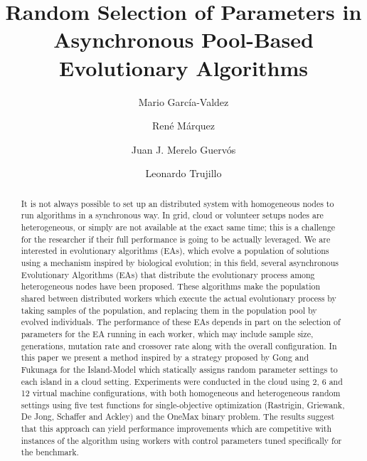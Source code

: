 \documentclass{llncs}
\begin{document}
\sloppy

\title{Random Selection of Parameters in Asynchronous Pool-Based Evolutionary Algorithms}

\author{Mario Garc\'ia-Valdez \and Ren\'e M\'arquez \and Juan J. Merelo Guerv\'os \and  Leonardo Trujillo }


\maketitle

\begin{abstract}
It is not always possible to set up an distributed system with
homogeneous nodes to run algorithms in a synchronous way. In grid,
cloud or volunteer setups nodes are heterogeneous, or simply are not
available at the exact same time; this is a challenge for the researcher if
their full performance is going to be actually leveraged. We are
interested in evolutionary algorithms (EAs), which evolve a population
of solutions using a mechanism inspired by biological evolution; in this field, 
several asynchronous Evolutionary Algorithms (EAs) that distribute the
evolutionary process among heterogeneous nodes have
been proposed. These algorithms make the population shared between
distributed workers  which execute the actual evolutionary
process by taking samples of the population, and replacing them in the
population pool by evolved individuals. The performance of these EAs
depends in part on the selection of parameters for the EA running in
each worker, which may include sample size, generations, mutation rate
and crossover rate along with the overall configuration. In this paper
we present a method inspired by a strategy proposed by Gong and Fukunaga for the
Island-Model which statically assigns random parameter settings to
each island in a cloud setting. Experiments were conducted in the
cloud using 2, 6 and 12 virtual machine configurations, with
both homogeneous and heterogeneous random settings using five 
test functions for single-objective optimization (Rastrigin, Griewank, De Jong, Schaffer 
and Ackley) and the OneMax binary problem. The results suggest that this approach can yield
performance improvements which are competitive with instances of the
algorithm using workers with control parameters tuned specifically for
the benchmark.

\end{abstract}
\end{document}
